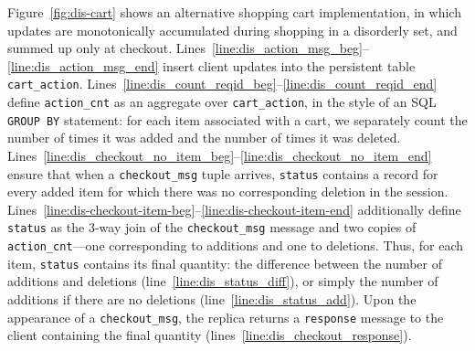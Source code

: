 Figure~\ref{fig:dis-cart} shows an alternative shopping cart
implementation, in which updates are monotonically accumulated during shopping
in a disorderly set, and summed up only at checkout.
Lines~\ref{line:dis_action_msg_beg}--\ref{line:dis_action_msg_end} insert client updates into the persistent
table \texttt{cart\_action}.  Lines~\ref{line:dis_count_reqid_beg}--\ref{line:dis_count_reqid_end} define
\texttt{action\_cnt} as an aggregate over \texttt{cart\_action}, in the style
of an SQL \texttt{GROUP BY} statement: for each item associated with a cart, we
separately count the number of times it was added and the number of times it
was deleted.
Lines~\ref{line:dis_checkout_no_item_beg}--\ref{line:dis_checkout_no_item_end}
ensure that when a \texttt{checkout\_msg} tuple arrives, \texttt{status}
contains a record for every added item for which there was no corresponding
deletion in the session.
Lines~\ref{line:dis-checkout-item-beg}--\ref{line:dis-checkout-item-end}
additionally define \texttt{status} as the 3-way join of the
\texttt{checkout\_msg} message and two copies of \texttt{action\_cnt}---one
corresponding to additions and one to deletions.  Thus, for each item,
\texttt{status} contains its final quantity: the difference between the number
of additions and deletions (line~\ref{line:dis_status_diff}), or simply the
number of additions if there are no deletions (line~\ref{line:dis_status_add}).
Upon the appearance of a \texttt{checkout\_msg}, the replica returns a
\texttt{response} message to the client containing the final quantity
(lines~\ref{line:dis_checkout_response}).


